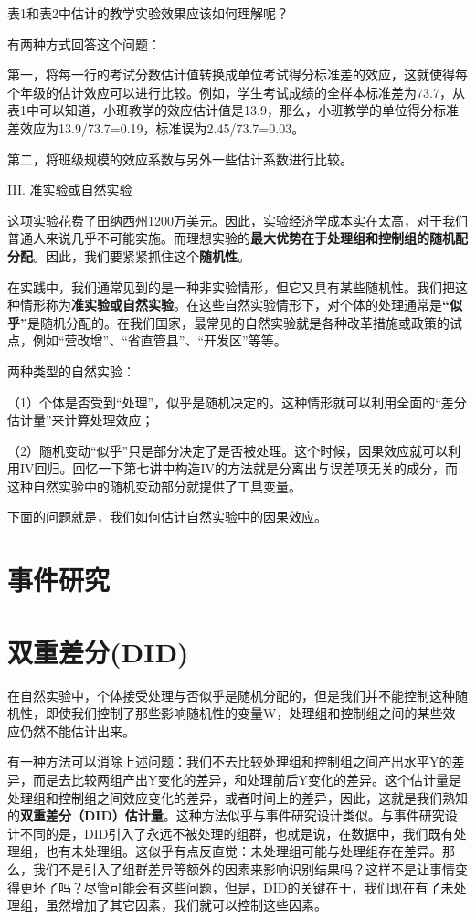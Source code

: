 \documentclass[cn,12pt,math=newtx,citestyle=gb7714-2015,bibstyle=gb7714-2015]{elegantbook}
\begin{document}
	表1和表2中估计的教学实验效果应该如何理解呢？
	
	有两种方式回答这个问题：
	
	第一，将每一行的考试分数估计值转换成单位考试得分标准差的效应，这就使得每个年级的估计效应可以进行比较。例如，学生考试成绩的全样本标准差为73.7，从表1中可以知道，小班教学的效应估计值是13.9，那么，小班教学的单位得分标准差效应为13.9/73.7=0.19，标准误为2.45/73.7=0.03。
	
	第二，将班级规模的效应系数与另外一些估计系数进行比较。
	
	III. 准实验或自然实验
	
	这项实验花费了田纳西州1200万美元。因此，实验经济学成本实在太高，对于我们普通人来说几乎不可能实施。而理想实验的\textbf{最大优势在于处理组和控制组的随机配分配}。因此，我们要紧紧抓住这个\textbf{随机性}。
	
	在实践中，我们通常见到的是一种非实验情形，但它又具有某些随机性。我们把这种情形称为\textbf{准实验或自然实验}。在这些自然实验情形下，对个体的处理通常是\textbf{“似乎”}是随机分配的。在我们国家，最常见的自然实验就是各种改革措施或政策的试点，例如“营改增”、“省直管县”、“开发区”等等。
	
	两种类型的自然实验：
	
	（1）个体是否受到“处理”，似乎是随机决定的。这种情形就可以利用全面的“差分估计量”来计算处理效应；
	
	（2）随机变动“似乎”只是部分决定了是否被处理。这个时候，因果效应就可以利用IV回归。回忆一下第七讲中构造IV的方法就是分离出与误差项无关的成分，而这种自然实验中的随机变动部分就提供了工具变量。
	
	下面的问题就是，我们如何估计自然实验中的因果效应。
	
	\section{事件研究}
	
	
	
	
	\section{双重差分(DID)}
	
	在自然实验中，个体接受处理与否似乎是随机分配的，但是我们并不能控制这种随机性，即使我们控制了那些影响随机性的变量W，处理组和控制组之间的某些效应仍然不能估计出来。
	
	有一种方法可以消除上述问题：我们不去比较处理组和控制组之间产出水平Y的差异，而是去比较两组产出Y变化的差异，和处理前后Y变化的差异。这个估计量是处理组和控制组之间效应变化的差异，或者时间上的差异，因此，这就是我们熟知的\textbf{双重差分（DID）估计量}。这种方法似乎与事件研究设计类似。与事件研究设计不同的是，DID引入了永远不被处理的组群，也就是说，在数据中，我们既有处理组，也有未处理组。这似乎有点反直觉：未处理组可能与处理组存在差异。那么，我们不是引入了组群差异等额外的因素来影响识别结果吗？这样不是让事情变得更坏了吗？尽管可能会有这些问题，但是，DID的关键在于，我们现在有了未处理组，虽然增加了其它因素，我们就可以控制这些因素。
	
\end{document}
